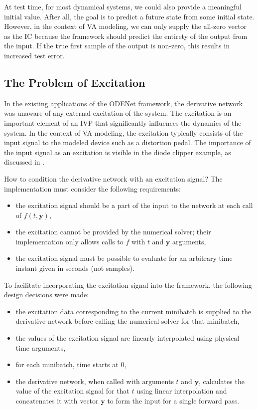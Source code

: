 At test time, for most dynamical systems, we could also provide a meaningful initial value. After all, the goal is to predict a future state from some initial state. However, in the context of \ac{VA} modeling, we can only supply the all-zero vector as the \ac{IC} because the framework should predict the entirety of the output from the input. If the true first sample of the output is non-zero, this results in increased test error.

\subsection{The Problem of Excitation}
\label{subsec:excitation}

In the existing applications of the ODENet framework, the derivative network was unaware of any external excitation of the system. The excitation is an important element of an \ac{IVP} that significantly influences the dynamics of the system. In the context of \ac{VA} modeling, the excitation typically consists of the input signal to the modeled device such as a distortion pedal. The importance of the input signal as an excitation is visible in the diode clipper example, as discussed in .

How to condition the derivative network with an excitation signal? The implementation must consider the following requirements:
\begin{itemize}
  \item the excitation signal should be a part of the input to the network at each call of $f(t, \pmb{y})$,
  \item the excitation cannot be provided by the numerical solver; their implementation only allows calls to $f$ with $t$ and $\pmb{y}$ arguments,
  \item the excitation signal must be possible to evaluate for an arbitrary time instant given in seconds (not samples).
\end{itemize}

To facilitate incorporating the excitation signal into the framework, the following design decisions were made:
\begin{itemize}
  \item the excitation data corresponding to the current minibatch is supplied to the derivative network before calling the numerical solver for that minibatch,
  \item the values of the excitation signal are linearly interpolated using physical time arguments,
  \item for each minibatch, time starts at 0,
  \item the derivative network, when called with arguments $t$ and $\pmb{y}$, calculates the value of the excitation signal for that $t$ using linear interpolation and concatenates it with vector $\pmb{y}$ to form the input for a single forward pass.
\end{itemize}

